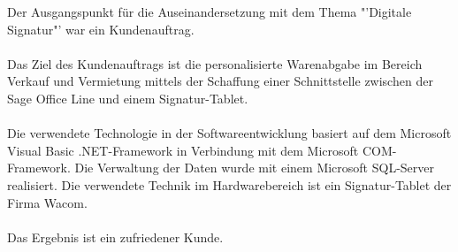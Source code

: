 Der Ausgangspunkt für die Auseinandersetzung mit dem Thema "'Digitale Signatur"' war ein Kundenauftrag. 
\\\\
Das Ziel des Kundenauftrags ist die personalisierte Warenabgabe im Bereich Verkauf und Vermietung mittels der Schaffung einer Schnittstelle zwischen der Sage Office Line und einem Signatur-Tablet.
\\\\
Die verwendete Technologie in der Softwareentwicklung basiert auf dem Microsoft Visual Basic .NET-Framework in Verbindung mit dem Microsoft COM-Framework. Die Verwaltung der Daten wurde mit einem Microsoft SQL-Server realisiert. Die verwendete Technik im Hardwarebereich ist ein Signatur-Tablet der Firma Wacom.
\\\\
Das Ergebnis ist ein zufriedener Kunde.